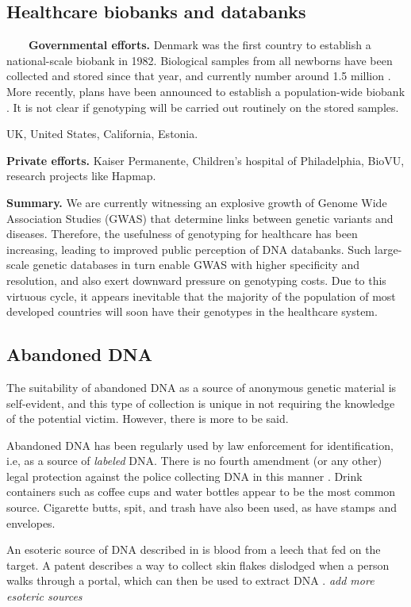 \documentclass{article}
\begin{document}
\subsection{Healthcare biobanks and databanks}

\ \ \ \ {\bf Governmental efforts.} Denmark was the first country to establish a national-scale biobank in 1982. Biological samples from all newborns have been collected and stored since that year, and currently number around 1.5 million \cite{denmark-newborn}. More recently, plans have been announced to establish a population-wide biobank \cite{denmark-biobank}. It is not clear if genotyping will be carried out routinely on the stored samples.

UK, United States, California, Estonia.

{\bf Private efforts.} Kaiser Permanente, Children's hospital of Philadelphia, BioVU, research projects like Hapmap.

{\bf Summary.} We are currently witnessing an explosive growth of Genome Wide Association Studies (GWAS) that determine links between genetic variants and diseases. Therefore, the usefulness of genotyping for healthcare has been increasing, leading to improved public perception of DNA databanks. Such large-scale genetic databases in turn enable GWAS with higher specificity and resolution, and also exert downward pressure on genotyping costs.  Due to this virtuous cycle, it appears inevitable that the majority of the population of most developed countries will soon have their genotypes in the healthcare system.

\subsection{Abandoned DNA}

The suitability of abandoned DNA as a source of anonymous genetic material is self-evident, and this type of collection is unique in not requiring the knowledge of the potential victim.  However, there is more to be said.  

Abandoned DNA has been regularly used by law enforcement for identification, i.e, as a source of {\em labeled} DNA.  There is no fourth amendment (or any other) legal protection against the police collecting DNA in this manner \cite{joh, 4th-survey}.  Drink containers such as coffee cups and water bottles appear to be the most common source. Cigarette butts, spit, and trash have also been used, as have stamps and envelopes. 

An esoteric source of DNA described in \cite{leech} is blood from a leech that fed on the target. A patent describes a way to collect skin flakes dislodged when a person walks through a portal, which can then be used to extract DNA \cite{skin-patent}. {\em add more esoteric sources}
\end{document}
